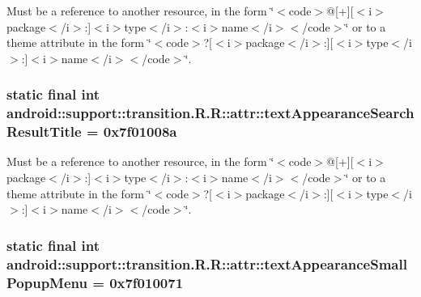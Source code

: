 Must be a reference to another resource, in the form \char`\"{}$<$code$>$@\mbox{[}+\mbox{]}\mbox{[}$<$i$>$package$<$/i$>$:\mbox{]}$<$i$>$type$<$/i$>$:$<$i$>$name$<$/i$>$$<$/code$>$\char`\"{} or to a theme attribute in the form \char`\"{}$<$code$>$?\mbox{[}$<$i$>$package$<$/i$>$:\mbox{]}\mbox{[}$<$i$>$type$<$/i$>$:\mbox{]}$<$i$>$name$<$/i$>$$<$/code$>$\char`\"{}. \hypertarget{classandroid_1_1support_1_1transition_1_1_r_1_1attr_71163b048137bc2a31a977e096a3ff18}{
\subsubsection[{textAppearanceSearchResultTitle}]{\setlength{\rightskip}{0pt plus 5cm}static final int android::support::transition.R.R::attr::textAppearanceSearchResultTitle = 0x7f01008a}}
\label{classandroid_1_1support_1_1transition_1_1_r_1_1attr_71163b048137bc2a31a977e096a3ff18}


Must be a reference to another resource, in the form \char`\"{}$<$code$>$@\mbox{[}+\mbox{]}\mbox{[}$<$i$>$package$<$/i$>$:\mbox{]}$<$i$>$type$<$/i$>$:$<$i$>$name$<$/i$>$$<$/code$>$\char`\"{} or to a theme attribute in the form \char`\"{}$<$code$>$?\mbox{[}$<$i$>$package$<$/i$>$:\mbox{]}\mbox{[}$<$i$>$type$<$/i$>$:\mbox{]}$<$i$>$name$<$/i$>$$<$/code$>$\char`\"{}. \hypertarget{classandroid_1_1support_1_1transition_1_1_r_1_1attr_6839a840cfc2796b27628077230f5687}{
\subsubsection[{textAppearanceSmallPopupMenu}]{\setlength{\rightskip}{0pt plus 5cm}static final int android::support::transition.R.R::attr::textAppearanceSmallPopupMenu = 0x7f010071}}
\label{classandroid_1_1support_1_1transition_1_1_r_1_1attr_6839a840cfc2796b27628077230f5687}


